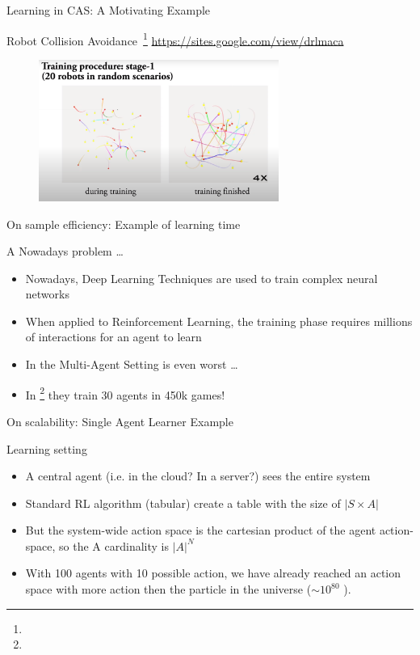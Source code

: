 \documentclass[presentation]{beamer}\mode<presentation>{\usetheme{AMSBolognaFC}}
\begin{document}
\begin{frame}{Learning in CAS: A Motivating Example}
	\begin{exampleblock}{Robot Collision Avoidance~\footnote[frame]{} \url{https://sites.google.com/view/drlmaca}}
		\centering
		\begin{figure}
			\href{https://www.youtube.com/watch?v=Uj1yAmlL5lk}{\includegraphics[width=0.7\textwidth]{img/collective-learning.png}}
		\end{figure}
	\end{exampleblock}
\end{frame}
\begin{frame}{On sample efficiency: Example of learning time }
	\begin{exampleblock}{A Nowadays problem \dots}
		\begin{itemize}
			\item Nowadays, Deep Learning Techniques are used to train complex neural networks
			\item When applied to Reinforcement Learning, the training phase requires millions of interactions for an agent to learn
			\item In the Multi-Agent Setting is even worst \dots
			\item In \footnote[frame]{} they train 30 agents in 450k games!
		\end{itemize}
	\end{exampleblock}
\end{frame}
\begin{frame}{On scalability: Single Agent Learner Example}
	\begin{exampleblock}{Learning setting}
		\begin{itemize}
			\item A central agent (i.e. in the cloud? In a server?) sees the entire system
			\item Standard RL algorithm (tabular) create a table with the size of $|S \times A|$
			\item But the system-wide action space is the cartesian product of the agent action-space, so the A cardinality is $|A|^N$
			\item With 100 agents with 10 possible action, we have already reached an action space with more action then the particle in the universe ($\sim 10^{80}$ \href{https://en.wikipedia.org/wiki/Eddington_number}{\faLink}).
		\end{itemize}
	\end{exampleblock}
\end{frame}
\end{document}
